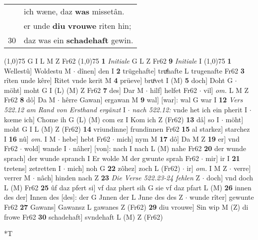 \documentclass[8pt,a4paper,notitlepage]{article}
\begin{document}
\begin{table}[ht]
\begin{minipage}[t]{0.5\linewidth}
\begin{tabular}{rl}
 & ich wæne, daz \textbf{was} missetân.\\ 
 & er unde \textbf{diu} \textbf{vrouwe} riten hin;\\ 
30 & daz was ein \textbf{schadehaft} gewin.\\ 
\end{tabular}
\scriptsize
\line(1,0){75} \newline
G I L M Z Fr62 \newline
\line(1,0){75} \newline
\textbf{1} \textit{Initiale} G L Z Fr62  \textbf{9} \textit{Initiale} I  \newline
\line(1,0){75} \newline
\textbf{1} Wellestû] Woldestu M  $\cdot$ dînen] den I \textbf{2} trügehafte] truͯhafte L trugenafte Fr62 \textbf{3} rîten unde kêre] Ritet vnde kerit M \textbf{4} prüeve] bruͦvet I (M) \textbf{5} doch] Doht G  $\cdot$ möht] moht G I (L) (M) Z Fr62 \textbf{7} des] Dar M  $\cdot$ hilf] helfet Fr62  $\cdot$ vil] \textit{om.} L M Z Fr62 \textbf{8} dô] Da M  $\cdot$ hêrre Gawan] ergawan M \textbf{9} wal] [war]: wal G war I \textbf{12} \textit{Vers 522.12 am Rand von Ersthand ergänzt} I   $\cdot$ \textit{nach 522.12:} vnde het ich ein pherit I   $\cdot$ kœme ich] Chome ih G (L) (M) com ez I Kom ich Z (Fr62) \textbf{13} dâ] so I  $\cdot$ möht] moht G I L (M) Z (Fr62) \textbf{14} vriundinne] frundinnen Fr62 \textbf{15} al starkez] starchez I \textbf{16} nû] \textit{om.} I M  $\cdot$ hebe] hebt Fr62  $\cdot$ mich] nym M \textbf{17} dô] Da M Z \textbf{19} er] vnd Fr62  $\cdot$ wold] wande I  $\cdot$ nâher] [von]: nach I nach L (M) nahe Fr62 \textbf{20} der wunde sprach] der wunde spranch I Er wolde M der gwunte sprah Fr62  $\cdot$ mir] ir I \textbf{21} tretens] zetretten I  $\cdot$ mich] noh G \textbf{22} zôhez] zoch L (Fr62)  $\cdot$ ir] \textit{om.} I M Z  $\cdot$ verre] verrer M  $\cdot$ nâch] hinden nach Z \textbf{23} \textit{Die Verse 522.23-24 fehlen} Z   $\cdot$ doch] vnd doch L (M) Fr62 \textbf{25} ûf daz pfert si] vf daz phert sih G sie vf daz pfart L (M) \textbf{26} innen des der] Innen des [des]: der G Jnnen der L Jnne des des Z  $\cdot$ wunde rîter] gewunte Fr62 \textbf{27} Gawans] Gawansz L gawanes Z (Fr62) \textbf{29} diu vrouwe] Sin wip M (Z) di frowe Fr62 \textbf{30} schadehaft] svndehaft L (M) Z (Fr62) \newline
\end{minipage}
\hspace{0.5cm}
\begin{minipage}[t]{0.5\linewidth}
\small
\begin{center}*T

\end{center}
\end{minipage}
\end{table}
\end{document}
